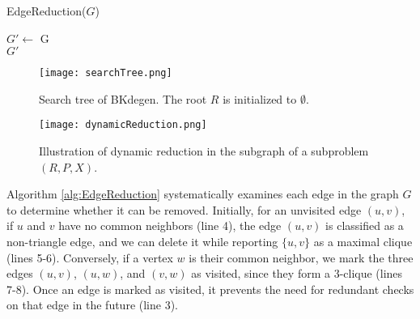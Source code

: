 \documentclass[sigconf, nonacm]{acmart}
\begin{document}
\begin{algorithm}[t]
    \caption{EdgeReduction($G$)}
    \label{alg:EdgeReduction}
    \nl $G' \leftarrow$ G \\
    \nl {}
    \nl \KwRet $G'$ \\
\end{algorithm}

\begin{figure}[tbp]
\centerline{\texttt{[image: searchTree.png]}}
\vspace{-0.1in}
\caption{Search tree of BKdegen. The root $R$ is initialized to $\emptyset$.}
\label{fig2}
\vspace{-0.05in}
\end{figure}

\begin{figure*}[t]
\vspace{-0.1in}
\centering
\centerline{\texttt{[image: dynamicReduction.png]}}
\vspace{-0.1in}
\caption{Illustration of dynamic reduction in the subgraph of a subproblem $(R,P,X)$.}
\label{fig3}
\vspace{-0.1in}
\end{figure*}

Algorithm \ref{alg:EdgeReduction} systematically examines each edge in the graph $G$ to determine whether it can be removed. 
Initially, for an unvisited edge $(u,v)$, if $u$ and $v$ have no common neighbors (line 4), the edge $(u,v)$ is classified as a non-triangle edge, and we can delete it while reporting $\{u,v\}$ as a maximal clique (lines 5-6). Conversely, if a vertex $w$ is their common neighbor, we mark the three edges $(u,v)$, $(u,w)$, and $(v,w)$ as visited, since they form a 3-clique (lines 7-8). Once an edge is marked as visited, it prevents the need for redundant checks on that edge in the future (line 3). 
\end{document}
